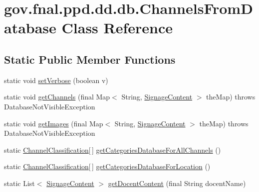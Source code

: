 \hypertarget{classgov_1_1fnal_1_1ppd_1_1dd_1_1db_1_1ChannelsFromDatabase}{\section{gov.\-fnal.\-ppd.\-dd.\-db.\-Channels\-From\-Database Class Reference}
\label{classgov_1_1fnal_1_1ppd_1_1dd_1_1db_1_1ChannelsFromDatabase}
}
\subsection*{Static Public Member Functions}
\begin{DoxyCompactItemize}
\item 
static void \hyperlink{classgov_1_1fnal_1_1ppd_1_1dd_1_1db_1_1ChannelsFromDatabase_a2927f979624caa1ad4756f40d14579ee}{set\-Verbose} (boolean v)
\item 
static void \hyperlink{classgov_1_1fnal_1_1ppd_1_1dd_1_1db_1_1ChannelsFromDatabase_a4f56bc3df86bc166d052a5e1df5be71a}{get\-Channels} (final Map$<$ String, \hyperlink{interfacegov_1_1fnal_1_1ppd_1_1dd_1_1signage_1_1SignageContent}{Signage\-Content} $>$ the\-Map)  throws Database\-Not\-Visible\-Exception 
\item 
static void \hyperlink{classgov_1_1fnal_1_1ppd_1_1dd_1_1db_1_1ChannelsFromDatabase_aaff901450a95798cbb5ed035d2ab3af6}{get\-Images} (final Map$<$ String, \hyperlink{interfacegov_1_1fnal_1_1ppd_1_1dd_1_1signage_1_1SignageContent}{Signage\-Content} $>$ the\-Map)  throws Database\-Not\-Visible\-Exception 
\item 
static \hyperlink{classgov_1_1fnal_1_1ppd_1_1dd_1_1changer_1_1ChannelClassification}{Channel\-Classification}\mbox{[}$\,$\mbox{]} \hyperlink{classgov_1_1fnal_1_1ppd_1_1dd_1_1db_1_1ChannelsFromDatabase_a03a1670da07103e86d4ba43cb1d76760}{get\-Categories\-Database\-For\-All\-Channels} ()
\item 
static \hyperlink{classgov_1_1fnal_1_1ppd_1_1dd_1_1changer_1_1ChannelClassification}{Channel\-Classification}\mbox{[}$\,$\mbox{]} \hyperlink{classgov_1_1fnal_1_1ppd_1_1dd_1_1db_1_1ChannelsFromDatabase_a7a996aee37485b2a92535492facf9a92}{get\-Categories\-Database\-For\-Location} ()
\item 
static List$<$ \hyperlink{interfacegov_1_1fnal_1_1ppd_1_1dd_1_1signage_1_1SignageContent}{Signage\-Content} $>$ \hyperlink{classgov_1_1fnal_1_1ppd_1_1dd_1_1db_1_1ChannelsFromDatabase_a7a75e0d979b68647f696f9a0ac717d64}{get\-Docent\-Content} (final String docent\-Name)

\end{DoxyCompactItemize}
